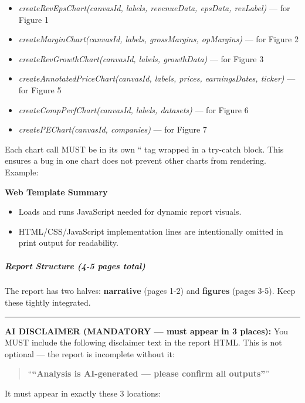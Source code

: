 \documentclass[11pt]{article}
\begin{document}
\begin{itemize}[leftmargin=*,itemsep=2pt,topsep=2pt]
\item {} \emph{createRevEpsChart(canvasId, labels, revenueData, epsData, revLabel)} — for Figure 1
\item {} \emph{createMarginChart(canvasId, labels, grossMargins, opMargins)} — for Figure 2
\item {} \emph{createRevGrowthChart(canvasId, labels, growthData)} — for Figure 3
\item {} \emph{createAnnotatedPriceChart(canvasId, labels, prices, earningsDates, ticker)} — for Figure 5
\item {} \emph{createCompPerfChart(canvasId, labels, datasets)} — for Figure 6
\item {} \emph{createPEChart(canvasId, companies)} — for Figure 7
\end{itemize}

Each chart call MUST be in its own `` tag wrapped in a try-catch block. This ensures a bug in one chart does not prevent other charts from rendering. Example:

\textbf{Web Template Summary}
\begin{itemize}[leftmargin=*,itemsep=2pt,topsep=2pt]
\item {} Loads and runs JavaScript needed for dynamic report visuals.
\item {} HTML/CSS/JavaScript implementation lines are intentionally omitted in print output for readability.
\end{itemize}

\subparagraph{Report Structure (4-5 pages total)}\mbox{}\par

The report has two halves: \textbf{narrative} (pages 1-2) and \textbf{figures} (pages 3-5). Keep these tightly integrated.


\vspace{0.5em}\hrule\vspace{0.5em}

\textbf{AI DISCLAIMER (MANDATORY — must appear in 3 places):} You MUST include the following disclaimer text in the report HTML. This is not optional — the report is incomplete without it:


\begin{quote}
``\textbf{``Analysis is AI-generated — please confirm all outputs''}''
\end{quote}

It must appear in exactly these 3 locations:
\end{document}
